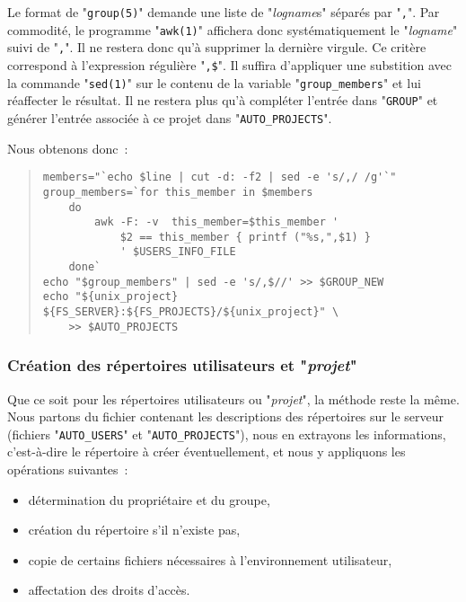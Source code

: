 Le format de "{\tt group(5)}" demande une liste de "{\sl logname}s" s{\'e}par{\'e}s
par "{\tt ,}". Par commodit{\'e}, le programme "{\tt awk(1)}" affichera donc
syst{\'e}matiquement le "{\sl logname}" suivi de "{\tt ,}". Il ne restera donc
qu'{\`a} supprimer la derni{\`e}re virgule. Ce crit{\`e}re correspond {\`a} l'expression r{\'e}guli{\`e}re
"\verb=,$=". Il suffira d'appliquer une substition avec la commande "{\tt sed(1)}"
sur le contenu de la variable "{\tt group\_members}" et lui r{\'e}affecter le r{\'e}sultat.
Il ne restera plus qu'{\`a} compl{\'e}ter l'entr{\'e}e dans "{\tt GROUP}" et g{\'e}n{\'e}rer l'entr{\'e}e
associ{\'e}e {\`a} ce projet dans "{\tt AUTO\_PROJECTS}".

Nous obtenons donc~:
\begin{quote}
\begin{verbatim}
members="`echo $line | cut -d: -f2 | sed -e 's/,/ /g'`"
group_members=`for this_member in $members
    do
        awk -F: -v  this_member=$this_member '
            $2 == this_member { printf ("%s,",$1) }
            ' $USERS_INFO_FILE
    done`
echo "$group_members" | sed -e 's/,$//' >> $GROUP_NEW
echo "${unix_project}   ${FS_SERVER}:${FS_PROJECTS}/${unix_project}" \
    >> $AUTO_PROJECTS
\end{verbatim}
\end{quote}

\subsubsection{\label{adv-programming-ex3-devlmkdir}Cr{\'e}ation des r{\'e}pertoires utilisateurs et "{\sl projet}"}

Que ce soit pour les r{\'e}pertoires utilisateurs ou "{\sl projet}", la m{\'e}thode reste la
m{\^e}me. Nous partons du fichier contenant les descriptions des r{\'e}pertoires sur le serveur
(fichiers "{\tt AUTO\_USERS}" et "{\tt AUTO\_PROJECTS}"), nous en extrayons les
informations, c'est-{\`a}-dire le r{\'e}pertoire {\`a} cr{\'e}er {\'e}ventuellement, et nous y appliquons
les op{\'e}rations suivantes~:
\begin{itemize}
	\item	d{\'e}termination du propri{\'e}taire et du groupe,
	\item	cr{\'e}ation du r{\'e}pertoire s'il n'existe pas,
	\item	copie de certains fichiers n{\'e}cessaires {\`a} l'environnement utilisateur,
	\item	affectation des droits d'acc{\`e}s.
\end{itemize}

